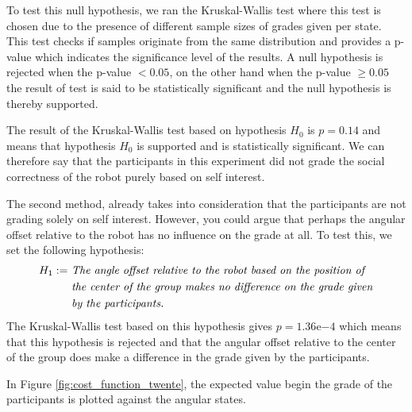 \documentclass[a4paper,11pt]{report}
\begin{document}
To test this null hypothesis, we ran the Kruskal-Wallis test where this test is chosen due to the presence of different sample sizes of grades given per state.
This test checks if samples originate from the same distribution and provides a p-value which indicates the significance level of the results.
A null hypothesis is rejected when the p-value $< 0.05$, on the other hand when the p-value $\geq 0.05$ the result of test is said to be statistically significant and the null hypothesis is thereby supported. 

The result of the Kruskal-Wallis test based on hypothesis $H_0$ is $p = 0.14$ and 
means that hypothesis $H_0$ is supported and is statistically significant.
We can therefore say that the participants in this experiment did not grade the social correctness of the robot purely based on self interest.

The second method, already takes into consideration that the participants are not grading solely on self interest.
However, you could argue that perhaps the angular offset relative to the robot has no influence on the grade at all.
To test this, we set the following hypothesis:
\begin{align*}
 H_1 := & \text{ \textit{The angle offset relative to the robot based on the position of}} \\
        & \text{ \textit{the center of the group makes no difference on the grade given}} \\
        & \text{ \textit{by the participants.}}
\end{align*}
The Kruskal-Wallis test based on this hypothesis gives $p = 1.36\mathrm{e}{-4}$ which means that this hypothesis is rejected and that the angular offset relative to the center of the group does make a difference in the grade given by the participants.

%
%

In Figure \ref{fig:cost_function_twente}, the expected value begin the grade of the participants is plotted against the angular states. 
\end{document}
